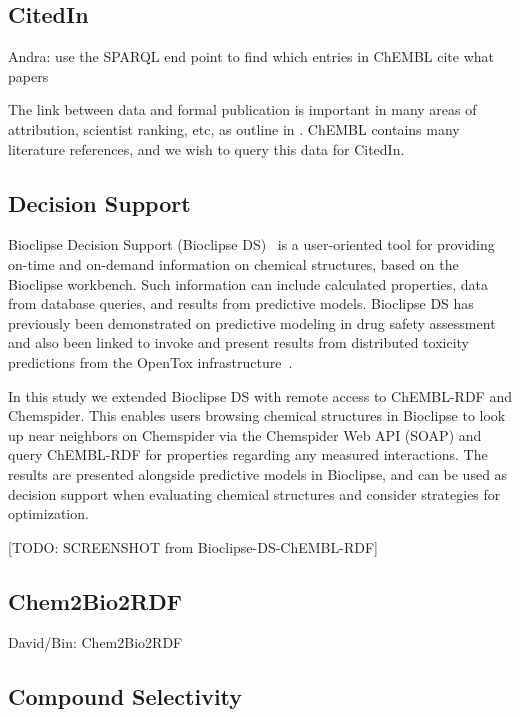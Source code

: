 \documentclass[sw]{iosart2c}
\begin{document}
\subsection{CitedIn}

Andra: use the SPARQL end point to find which entries in ChEMBL cite what papers
 
The link between data and formal publication is important in many areas of
attribution, scientist ranking, etc, as outline in \cite{Waagmeester2012}.
ChEMBL contains many literature references, and we wish to query this data
for CitedIn.

\subsection{Decision Support}


Bioclipse Decision Support (Bioclipse DS)~\cite{Spjuth:2011uq} is a user-oriented tool for 
providing on-time and on-demand information on chemical structures, based on the Bioclipse 
workbench. Such information can include calculated properties, data from database queries, 
and results from predictive models. Bioclipse DS has previously been demonstrated on predictive 
modeling in drug safety assessment~\cite{Spjuth:2011uq} and also been linked to invoke and 
present results from distributed toxicity predictions from the OpenTox infrastructure~\cite{Willighagen:2011kx}.

In this study we extended Bioclipse DS with remote access to ChEMBL-RDF and Chemspider. 
This enables users browsing chemical structures in Bioclipse to look up near neighbors on Chemspider 
via the Chemspider Web API (SOAP) and query ChEMBL-RDF for properties regarding any measured interactions. 
The results are presented alongside predictive models in Bioclipse, and can be used as 
decision support when evaluating chemical structures and consider strategies for optimization.

[TODO: SCREENSHOT from Bioclipse-DS-ChEMBL-RDF]

\subsection{Chem2Bio2RDF}

David/Bin: Chem2Bio2RDF

\subsection{Compound Selectivity}
\end{document}
